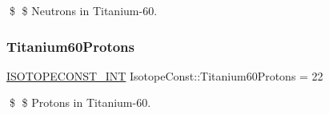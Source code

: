 \$ \$ Neutrons in Titanium-\/60. \mbox{\label{group___isotope_const-_titanium-_ti60_ga7e1e90275e3caa054eacc8a5045c3d35}} 
\subsubsection{\texorpdfstring{Titanium60\+Protons}{Titanium60Protons}}
{\footnotesize\ttfamily \mbox{\hyperlink{group___isotope_const-_macros_ga5f18360b3e99483a35c32d789e62621c}{I\+S\+O\+T\+O\+P\+E\+C\+O\+N\+S\+T\+\_\+\+I\+NT}} Isotope\+Const\+::\+Titanium60\+Protons = 22}

\$ \$ Protons in Titanium-\/60. 